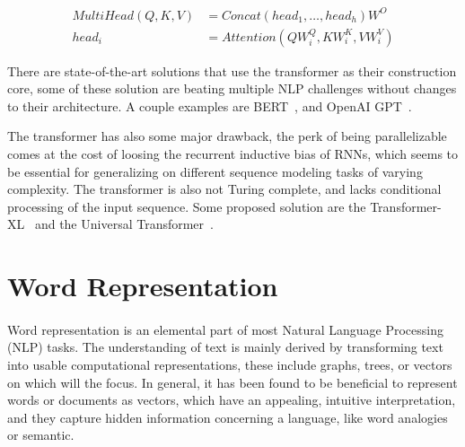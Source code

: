 \begin{equation}
    \begin{split}
        MultiHead(Q, K, V) & = Concat\left(head_{1}, \ldots,  head_{h}\right) W^{O} \\
        head_{i} & = Attention \left(Q W_{i}^{Q}, K W_{i}^{K}, V W_{i}^{V}\right)
    \end{split}
    \label{eq:multi_attention}
\end{equation}

There are state-of-the-art solutions that use the transformer as their construction core, some of these solution are beating multiple NLP challenges without changes to their architecture. A couple examples are BERT~\citep{devlin2018bert}, and OpenAI GPT~\citep{radford2018improving}. 

The transformer has also some major drawback, the perk of being parallelizable comes at the cost of loosing the recurrent inductive bias of RNNs, which seems to be essential for generalizing on different sequence modeling tasks of varying complexity. The transformer is also not Turing complete, and lacks conditional processing of the input sequence. Some proposed solution are the Transformer-XL~\citep{dai2019transformerxl} and the Universal Transformer~\citep{dehghani2018universal}. 

\section{Word Representation}
\label{sec:word_embedding}
\paragraph{}
Word representation is an elemental part of most Natural Language Processing (NLP) tasks. The understanding of text is mainly derived by transforming text into usable computational representations, these include graphs, trees, or vectors on which will the focus.   In general, it has been found to be beneficial to represent words or documents as vectors, which have an appealing, intuitive interpretation, and they capture hidden information concerning a language, like word analogies or semantic. 


